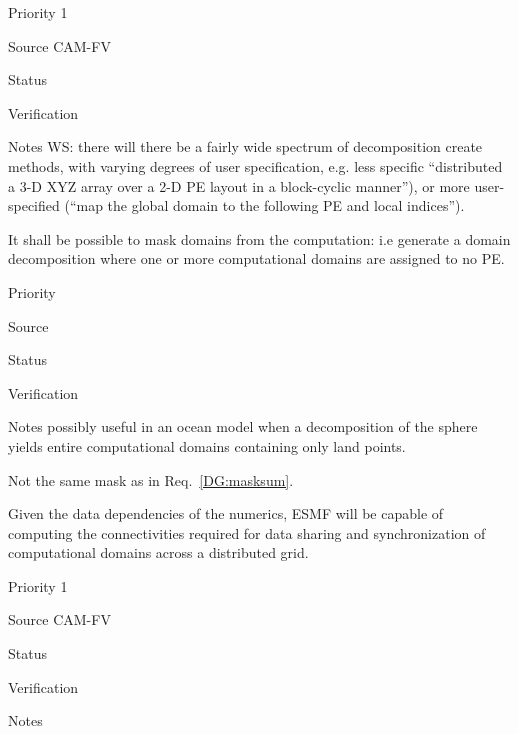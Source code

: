 \begin{reqlist}
\item[Priority] 1
\item[Source] CAM-FV
\item[Status]
\item[Verification]
\item[Notes] WS:  there will there be a fairly wide spectrum 
of decomposition create methods, with varying degrees of user
specification, e.g. less specific ``distributed a 3-D XYZ array 
over a 2-D PE layout in a block-cyclic manner''), or more 
user-specified (``map the global domain to the following PE 
and local indices'').

\end{reqlist}

 \label{DG:masklayout}

It shall be possible to mask domains from the computation: i.e
generate a domain decomposition where one or more computational
domains are assigned to no PE.

\begin{reqlist}
\item[Priority]
\item[Source]
\item[Status]
\item[Verification]
\item[Notes] possibly useful in an ocean model when a decomposition
  of the sphere yields entire computational domains containing only
  land points.

  Not the same mask as in Req.~\ref{DG:masksum}.
\end{reqlist}


Given the data dependencies of the numerics, ESMF will be capable of
computing the connectivities required for data sharing and
synchronization of computational domains across a distributed grid.


\begin{reqlist}
\item[Priority] 1
\item[Source] CAM-FV
\item[Status]
\item[Verification]
\item[Notes] 

\end{reqlist}


